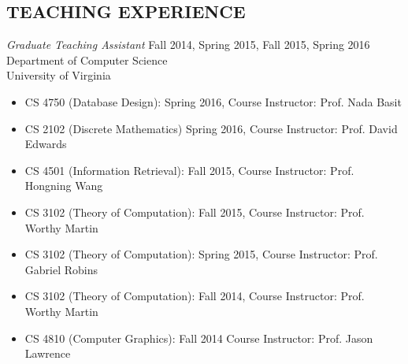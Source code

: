 \documentclass[11pt]{res}
\begin{document}
\begin{resume}
\begin{comment}
\section{RELATED COURSEWORKS}
\vspace{8pt}
\begin{tabular}{l l}
     \textbf{Graduate}& \textbf{Undergraduate} \\
     Information Retrieval & Discrete Mathematics \\
     Text Mining & Algorithms \\
     Advanced Algorithms &  Artificial Intelligence\\
     High Dimensional Data Management & Mathematical Analysis for Computer Science\\
     Neural Networks & \\
     Data Science in Software Engineering & \\
     Theory of Computation & \\
\end{tabular}
\end{comment}

\section{TEACHING EXPERIENCE}
{\sl Graduate Teaching Assistant} \hfill        Fall 2014, Spring 2015, Fall 2015, Spring 2016\\
Department of Computer Science\\
University of Virginia\\
\begin{itemize} \itemsep -2pt %
   \item CS 4750 (Database Design): Spring 2016,  Course Instructor: Prof. Nada Basit
   \item CS 2102 (Discrete Mathematics) Spring 2016, Course Instructor: Prof. David Edwards
   \item CS 4501 (Information Retrieval): Fall 2015, Course Instructor: Prof. Hongning Wang 
   \item CS 3102 (Theory of Computation): Fall 2015, Course Instructor: Prof. Worthy Martin
   \item CS 3102 (Theory of Computation): Spring 2015, Course Instructor: Prof. Gabriel Robins
   \item CS 3102 (Theory of Computation): Fall 2014, Course Instructor: Prof. Worthy Martin
   \item CS 4810 (Computer Graphics): Fall 2014 Course Instructor: Prof. Jason Lawrence
\end{itemize}


\end{resume}
\end{document}
